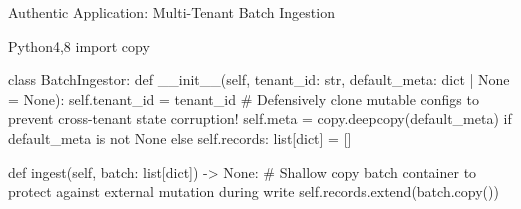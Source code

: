 \begin{frame}[fragile]{Authentic Application: Multi-Tenant Batch Ingestion}
  \begin{HighlightedCodeBlock}{Python}{4,8}
import copy

class BatchIngestor:
    def __init__(self, tenant_id: str, default_meta: dict | None = None):
        self.tenant_id = tenant_id
        # Defensively clone mutable configs to prevent cross-tenant state corruption!
        self.meta = copy.deepcopy(default_meta) if default_meta is not None else {}
        self.records: list[dict] = []

    def ingest(self, batch: list[dict]) -> None:
        # Shallow copy batch container to protect against external mutation during write
        self.records.extend(batch.copy())
  \end{HighlightedCodeBlock}
  \vfill
\end{frame}

